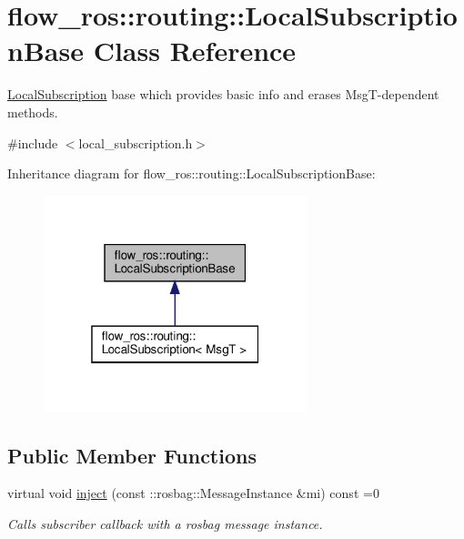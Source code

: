 \hypertarget{classflow__ros_1_1routing_1_1_local_subscription_base}{}\section{flow\+\_\+ros\+:\+:routing\+:\+:Local\+Subscription\+Base Class Reference}
\label{classflow__ros_1_1routing_1_1_local_subscription_base}


\hyperlink{classflow__ros_1_1routing_1_1_local_subscription}{Local\+Subscription} base which provides basic info and erases Msg\+T-\/dependent methods.  




{\ttfamily \#include $<$local\+\_\+subscription.\+h$>$}



Inheritance diagram for flow\+\_\+ros\+:\+:routing\+:\+:Local\+Subscription\+Base\+:\nopagebreak
\begin{figure}[H]
\begin{center}
\leavevmode
\includegraphics[width=217pt]{classflow__ros_1_1routing_1_1_local_subscription_base__inherit__graph}
\end{center}
\end{figure}
\subsection*{Public Member Functions}
\begin{DoxyCompactItemize}
\item 
\mbox{\label{classflow__ros_1_1routing_1_1_local_subscription_base_aa2742e8cb1bd70ed0fd6fab679853a7c}} 
virtual void \hyperlink{classflow__ros_1_1routing_1_1_local_subscription_base_aa2742e8cb1bd70ed0fd6fab679853a7c}{inject} (const \+::rosbag\+::\+Message\+Instance \&mi) const =0
\begin{DoxyCompactList}\small\item\em Calls subscriber callback with a rosbag message instance. \end{DoxyCompactList}\end{DoxyCompactItemize}


